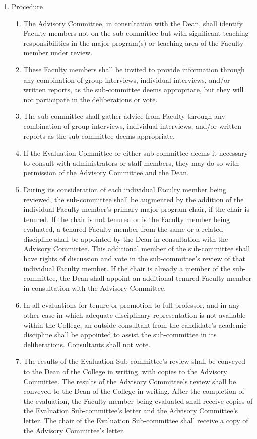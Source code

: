 \documentclass{manual}
\newcommand{\itemLevelA}{\alph*.}
\newcommand{\itemLevelB}{\arabic*)}
\newcommand{\itemRefA}{\alph*}
\newcommand{\itemRefB}{\arabic*}
\begin{document}
\begin{enumerate}[label=\itemLevelA,ref=\itemRefA]
	\item Procedure \label{item:procedure08}

		\begin{enumerate}[label=\itemLevelB,ref=\itemRefB]
		\item The Advisory Committee, in consultation with the Dean, shall identify Faculty members not on the sub-committee but with significant teaching responsibilities in the major program(s) or teaching area of the Faculty member under review.
		\item These Faculty members shall be invited to provide information through any combination of group interviews, individual interviews, and/or written reports, as the sub-committee deems appropriate, but they will not participate in the deliberations or vote.
		\item The sub-committee shall gather advice from Faculty through any combination of group interviews, individual interviews, and/or written reports as the sub-committee deems appropriate.
		\item If the Evaluation Committee or either sub-committee deems it necessary to consult with administrators or staff members, they may do so with permission of the Advisory Committee and the Dean.
		\item During its consideration of each individual Faculty member being reviewed, the sub-committee shall be augmented by the addition of the individual Faculty member's primary major program chair, if the chair is tenured. If the chair is not tenured or is the Faculty member being evaluated, a tenured Faculty member from the same or a related discipline shall be appointed by the Dean in consultation with the Advisory Committee. This additional member of the sub-committee shall have rights of discussion and vote in the sub-committee's review of that individual Faculty member. If the chair is already a member of the sub-committee, the Dean shall appoint an additional tenured Faculty member in consultation with the Advisory Committee.
		\item In all evaluations for tenure or promotion to full professor, and in any other case in which adequate disciplinary representation is not available within the College, an outside consultant from the candidate's academic discipline shall be appointed to assist the sub-committee in its deliberations. Consultants shall not vote.
		\item \label{item:results09} The results of the Evaluation Sub-committee's review shall be conveyed to the Dean of the College in writing, with copies to the Advisory Committee. The results of the Advisory Committee's review shall be conveyed to the Dean of the College in writing. After the completion of the evaluation, the Faculty member being evaluated shall receive copies of the Evaluation Sub-committee's letter and the Advisory Committee's letter. The chair of the Evaluation Sub-committee shall receive a copy of the Advisory Committee's letter.
		\end{enumerate}
	
	\end{enumerate}
\end{document}
